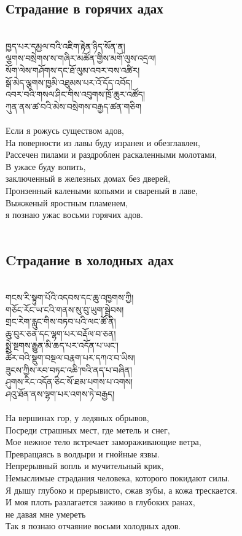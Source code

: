 \subsection*{Страдание в горячих адах}
\\
\ti
ཁྱད་པར་དམྱལ་བའི་འཇིག་རྟེན་ཉིད་སོན་ན།\\
ལྕགས་བསྲེགས་ས་གཞིར་མཚོན་གྱིས་མགོ་ལུས་འདྲལ།\\
སོག་ལེས་གཤོགས་དང་ཐོ་ལུམ་འབར་བས་འཚིར།\\
སྒོ་མེད་ལྕགས་ཁྱམི་འཐུམས་པར་འོ་དོད་འབོད།\\
འབར་བའི་གསལ་ཤིང་གིས་འབུགས་ཁྲོ་ཆུར་འཚོད།\\
ཀུན་ནས་ཚ་བའི་མེས་བསྲེགས་བརྒྱད་ཚན་གཅིག\\
\\
\ru
Если я рожусь существом адов,\\
На поверности из лавы буду изранен и обезглавлен,\\
Рассечен пилами и раздроблен раскаленными молотами,\\
В ужасе буду вопить, \\ \indent заключенный в железных домах без дверей,\\
Пронзенный калеными копьями и свареный в лаве,\\
Выжженый яростным пламенем, \\ \indent я познаю ужас восьми горячих адов.\\
\\
\newpage
\subsection*{Cтрадание в холодных адах}
\\
\ti
གངས་རི་སྟུག་པོའི་འདབས་དང་ཆུ་འཁྱགས་ཀྱི། \\
གཅོང་རོང་ཡ་ངའི་གནས་སུ་བུ་ཡུག་སྦྲེབས། \\
གྲང་རེག་རླུང་གིས་བཏབ་པའི་ལང་ཚོ་ནི། \\
ཆུ་བུར་ཅན་དང་ལྷག་པར་བརྡོལ་བ་ཅན། \\
སྨྲེ་སྔགས་རྒྱུན་མི་ཆད་པར་འདོན་པ་ཡང་། \\
ཚོར་བའི་སྡུག་བསྔལ་བརྣག་པར་དཀའ་བ་ཡིས།\\
ཟུངས་ཀྱིས་རབ་བཏང་འཆི་ཁའི་ནད་པ་བཞིན།\\
ཤུགས་རིང་འདོན་ཅིང་སོ་ཐམ་པགས་པ་འགས། \\
ཤའུ་ཐོན་ནས་ལྷག་པར་འགས་ཏེ་བརྒྱད།\\
\\
\ru
На вершинах гор, у ледяных обрывов,\\
Посреди страшных мест, где метель и снег,\\
Мое нежное тело встречает замораживающие ветра,\\
Превращаясь в волдыри и гнойные язвы.\\
Непрерывный вопль и мучительный крик,\\
Немыслимые страдания человека, которого покидают силы.\\
Я дышу глубоко и прерывисто, сжав зубы, а кожа трескается.\\
И моя плоть разлагается заживо в глубоких ранах,\\
\indent не давая мне умереть\\
Так я познаю отчаяние восьми холодных адов.\\

